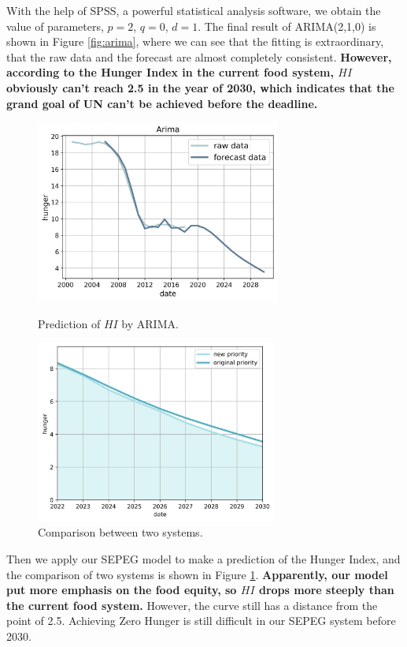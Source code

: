 \documentclass{mcmthesis}
\begin{document}
With the help of SPSS, a powerful statistical analysis software, we obtain the value of parameters, $p=2$, $q=0$, $d=1$. The final result of ARIMA(2,1,0) is shown in Figure \ref{fig:arima}, where we can see that the fitting is extraordinary, that the raw data and the forecast are almost completely consistent. \textbf{However, according to the Hunger Index in the current food system, $HI$ obviously can't reach 2.5 in the year of 2030, which indicates that the grand goal of UN can't be achieved before the deadline.
}
\begin{figure}[H]
    \begin{minipage}[c]{0.5\textwidth}
       \centering
       \includegraphics[height=6cm]{arima.png}
       \caption{Prediction of $HI$ by ARIMA.}
       \label{fig:arima}
       \end{minipage}
    \begin{minipage}[c]{0.5\textwidth}
       \centering
       \includegraphics[height=6cm]{hunger.png}
       \caption{Comparison between two systems.}
        \label{fig:hunger}
       \end{minipage}
\end{figure}

Then we apply our SEPEG model to make a prediction of the Hunger Index, and the comparison of two systems is shown in Figure \ref{fig:hunger}. \textbf{Apparently, our model put more emphasis on the food equity, so $HI$ drops more steeply than the current food system.} However, the curve still has a distance from the point of 2.5. Achieving Zero Hunger is still difficult in our SEPEG system before 2030.
\end{document}

